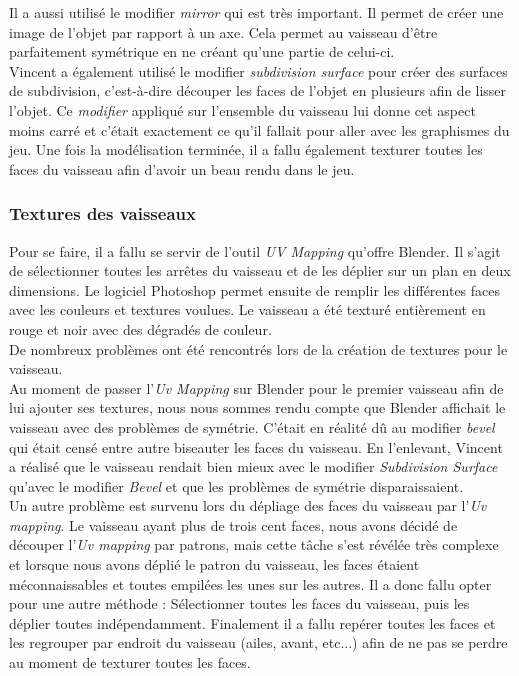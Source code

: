 \documentclass[12pt, titlepage]{article}
\begin{document}
\begin{spacing}{1.5}
Il a aussi utilisé le modifier \textit{mirror} qui est très important. Il permet de créer une image de l’objet par rapport à un axe. Cela permet au vaisseau d'être parfaitement symétrique en ne créant qu’une partie de celui-ci.\\

Vincent a également utilisé le modifier \textit{subdivision surface} pour créer des surfaces de subdivision, c’est-à-dire découper les faces de l’objet en plusieurs afin de lisser l’objet. Ce \textit{modifier} appliqué sur l’ensemble du vaisseau lui donne cet aspect moins carré et c’était exactement ce qu’il fallait pour aller avec les graphismes du jeu. Une fois la modélisation terminée, il a fallu également texturer toutes les faces du vaisseau afin d'avoir un beau rendu dans le jeu.\\

\subsubsection{Textures des vaisseaux}

Pour se faire, il a fallu se servir de l'outil \textit{UV Mapping} qu'offre Blender. Il s'agit de sélectionner toutes les arrêtes du vaisseau et de les déplier sur un plan en deux dimensions. Le logiciel Photoshop permet ensuite de remplir les différentes faces avec les couleurs et textures voulues. Le vaisseau a été texturé entièrement en rouge et noir avec des dégradés de couleur.\\
De nombreux problèmes ont été rencontrés lors de la création de textures pour le vaisseau.\\

Au moment de passer l’\textit{Uv Mapping} sur Blender pour le premier vaisseau afin de lui ajouter ses textures, nous nous sommes rendu compte que Blender affichait le vaisseau avec des problèmes de symétrie. C’était en réalité dû au modifier \textit{bevel} qui était censé entre autre biseauter les faces du vaisseau. En l’enlevant, Vincent a réalisé que le vaisseau rendait bien mieux avec le modifier \textit{Subdivision Surface} qu’avec le modifier \textit{Bevel} et que les problèmes de symétrie disparaissaient.\\

Un autre problème est survenu lors du dépliage des faces du vaisseau par l’\textit{Uv mapping}.
Le vaisseau ayant plus de trois cent faces, nous avons décidé de découper l’\textit{Uv mapping} par patrons, mais cette tâche s’est révélée très complexe et lorsque nous avons déplié le patron du vaisseau, les faces étaient méconnaissables et toutes empilées les unes sur les autres. Il a donc fallu opter pour une autre méthode : Sélectionner toutes les faces du vaisseau, puis les déplier toutes indépendamment. Finalement il a fallu repérer toutes les faces et les regrouper par endroit du vaisseau (ailes, avant, etc...) afin de ne pas se perdre au moment de texturer toutes les faces.\\


\end{spacing}
\end{document}
